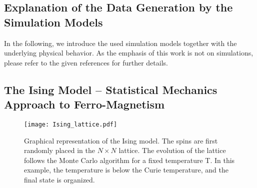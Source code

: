 \documentclass[11pt, authoryear]{elsarticle}
\begin{document}
	\begin{appendix}
		\section{Explanation of the Data Generation by the Simulation Models}
		\label{appendix:simulations}
		In the following, we introduce the used simulation models 
		together with the underlying physical behavior. As the emphasis of this work
		is not on simulations, please refer to the given references for further details.
		
		\subsection{The Ising Model -- Statistical Mechanics Approach to Ferro-Magnetism}
		
		\begin{figure}[!htb]
			\centering
			\texttt{[image: Ising\_lattice.pdf]}
			\caption{Graphical representation of the Ising model. The spins are first randomly placed in the $N \times N$ lattice. The evolution of the lattice follows the Monte Carlo algorithm for a fixed temperature T. In this example, the temperature is below the Curie temperature, and the final state is organized.}
			\label{fig:ising_lattice}
		\end{figure}
		

\end{appendix}
\end{document}
